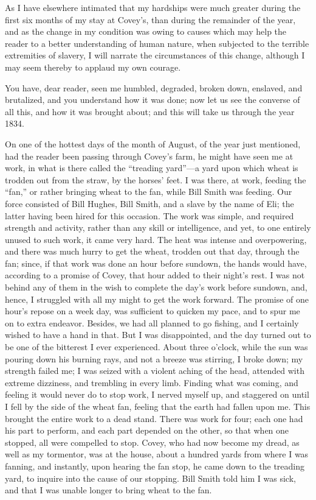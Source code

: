 As I have elsewhere intimated that my hardships were much greater during
the first six months of my stay at Covey's, than during the remainder of
the year, {\protect\hypertarget{223}{}{}}and as the change in my
condition was owing to causes which may help the reader to a better
understanding of human nature, when subjected to the terrible
extremities of slavery, I will narrate the circumstances of this change,
although I may seem thereby to applaud my own courage.

You have, dear reader, seen me humbled, degraded, broken down, enslaved,
and brutalized, and you understand how it was done; now let us see the
converse of all this, and how it was brought about; and this will take
us through the year 1834.

On one of the hottest days of the month of August, of the year just
mentioned, had the reader been passing through Covey's farm, he might
have seen me at work, in what is there called the ``treading yard''---a
yard upon which wheat is trodden out from the straw, by the horses'
feet. I was there, at work, feeding the ``fan,'' or rather bringing
wheat to the fan, while Bill Smith was feeding. Our force consisted of
Bill Hughes, Bill Smith, and a slave by the name of Eli; the latter
having been hired for this occasion. The work was simple, and required
strength and activity, rather than any skill or intelligence, and yet,
to one entirely unused to such work, it came very hard. The heat was
intense and overpowering, and there was much hurry to get the wheat,
trodden out that day, through the fan; since, if that work was done an
hour before sundown, the hands would have, according to a promise of
Covey, that hour added to their night's rest. I was not behind any of
them in the wish to complete the day's work before sundown, and, hence,
I struggled with all my might to get the work forward. The
{\protect\hypertarget{224}{}{}}promise of one hour's repose on a week
day, was sufficient to quicken my pace, and to spur me on to extra
endeavor. Besides, we had all planned to go fishing, and I certainly
wished to have a hand in that. But I was disappointed, and the day
turned out to be one of the bitterest I ever experienced. About three
o'clock, while the sun was pouring down his burning rays, and not a
breeze was stirring, I broke down; my strength failed me; I was seized
with a violent aching of the head, attended with extreme dizziness, and
trembling in every limb. Finding what was coming, and feeling it would
never do to stop work, I nerved myself up, and staggered on until I fell
by the side of the wheat fan, feeling that the earth had fallen upon me.
This brought the entire work to a dead stand. There was work for four;
each one had his part to perform, and each part depended on the other,
so that when one stopped, all were compelled to stop. Covey, who had now
become my dread, as well as my tormentor, was at the house, about a
hundred yards from where I was fanning, and instantly, upon hearing the
fan stop, he came down to the treading yard, to inquire into the cause
of our stopping. Bill Smith told him I was sick, and that I was unable
longer to bring wheat to the fan.

